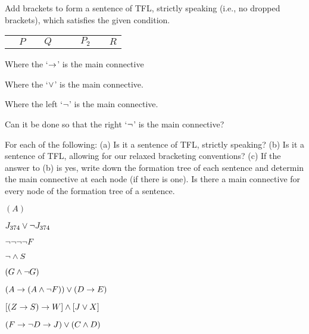 \begin{practiceproblems}

\solutions

\problempart 
Add brackets to form a sentence of TFL, strictly speaking (i.e., no dropped brackets), which satisfies the given condition. 
\begin{center}
	\begin{tabular}{>{\centering}p{.5em}>{\centering}p{.5em}>{\centering}p{.5em}>{\centering}p{.5em}>{\centering}p{.5em}>{\centering}p{.5em}>{\centering}p{.5em}>{\centering}p{.5em}>{\centering}p{.5em}}
		\enot &$P$&\eor &$Q$&\eif &\enot &$P_2$&\eand &$R$
	\end{tabular}
\end{center}

\begin{earg}
	\item Where the `$\rightarrow$' is the main connective
	\item Where the `$\vee$' is the main connective.
	\item Where the left `$\neg$' is the main connective. 
	\item Can it be done so that the right `$\neg$' is the main connective?
\end{earg}


\problempart
\label{pr.wiffTFL}
For each of the following: (a) Is it a sentence of TFL, strictly speaking? (b) Is it a sentence of TFL, allowing for our relaxed bracketing conventions? (c) If the answer to (b) is yes, write down the formation tree of each sentence and determin the main connective at each node (if there is one). Is there a main connective for every node of the formation tree of a sentence.
\begin{earg}
\item $(A)$\hfill {}
\item $J_{374} \vee \neg J_{374}$\hfill {}
\item $\neg \neg \neg \neg F$\hfill {}
\item $\neg \mathbin{\wedge} S$\hfill {}
\item $(G \mathbin{\wedge} \neg G)$\hfill {}
\item $(A \rightarrow (A \mathbin{\wedge} \neg F)) \vee (D \rightarrow E)$\hfill {}
\item $[(Z \rightarrow S) \rightarrow W] \mathbin{\wedge} [J \vee X]$\hfill {}
\item $(F \rightarrow \neg D \rightarrow J) \vee (C \mathbin{\wedge} D)$\hfill {}
\end{earg}



\end{practiceproblems}
